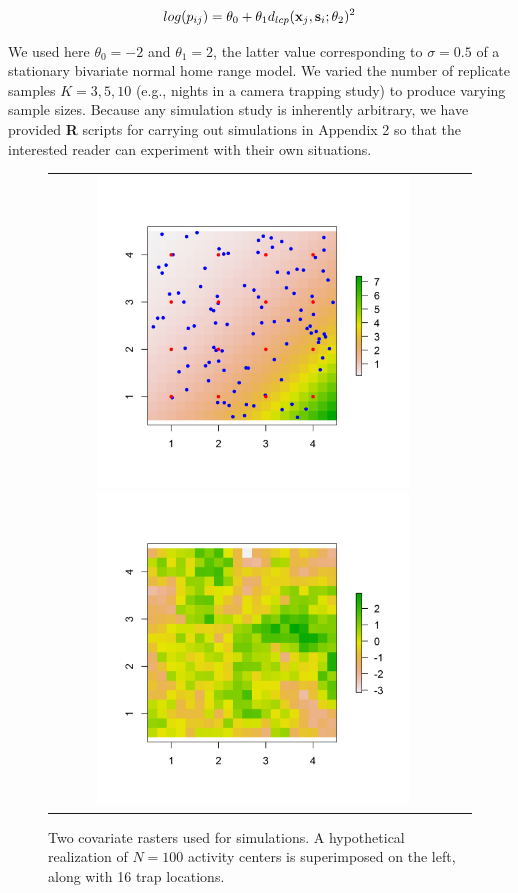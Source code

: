 \documentclass[12pt]{article}
\begin{document}
\begin{spacing}{1.8}
\[
log(p_{ij})= \theta_{0} + \theta_{1} d_{lcp}({\bf x}_{j},{\bf
  s}_{i}; \theta_{2})^{2}
\]

{\flushleft We } used here $\theta_{0} = -2$ and $\theta_{1} = 2$, the latter value
corresponding to $\sigma = 0.5$ of a stationary bivariate normal home
range model.  We varied the number of replicate samples $K=3,5,10$
(e.g., nights in a camera trapping study) to produce varying sample
sizes.  Because any simulation study is inherently arbitrary, we have
provided {\bf R} scripts for carrying out simulations in Appendix 2 so
that the interested reader can experiment with their own situations.

\begin{figure}
\begin{tabular}{cc}
\includegraphics[height=3.25in,width=3.25in]{figs/raster_withN100}
\includegraphics[height=3.25in,width=3.25in]{figs/raster_krige} &
\end{tabular}
\caption{Two covariate rasters used for simulations. A hypothetical
  realization of $N=100$ activity centers is superimposed on the left,
along with 16 trap locations. }
\label{ecoldist.fig.raster100}
\end{figure}


\end{spacing}
\end{document}

